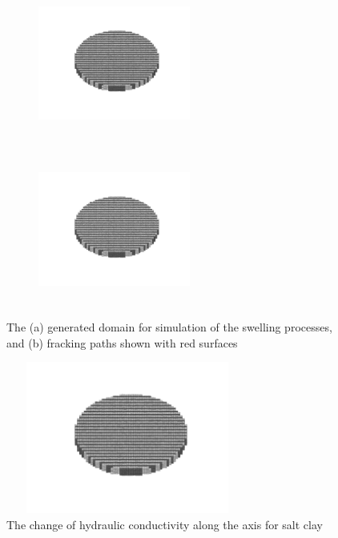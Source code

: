 \begin{figure}[!ht]
\begin{subfigure}[c]{0.5\textwidth}
\centering
\includegraphics[width=5cm,height=5cm]{figures/Amir_ME6_Lattice_Setup.png}
\subcaption{}
\label{fig:Amir_ME5_Lattice_Setup}
\end{subfigure}
\begin{subfigure}[c]{0.5\textwidth}
\centering
\includegraphics[width=5cm,height=5cm]{figures/Amir_ME6_Lattice_Setup.png}
\subcaption{}
\label{fig:Amir_ME5_Lattice_Frack}
\end{subfigure}
\caption{The (a) generated domain for simulation of the swelling processes, and (b) fracking paths shown with red surfaces}
\end{figure}


\begin{figure}[!ht]
\centering
\includegraphics[width=8cm,height=5cm]{figures/Amir_ME6_Lattice_Setup.png}
\caption{The change of hydraulic conductivity along the axis for salt clay}
\label{fig:Amir_ME5_Lattice_Drying}
\end{figure} 



